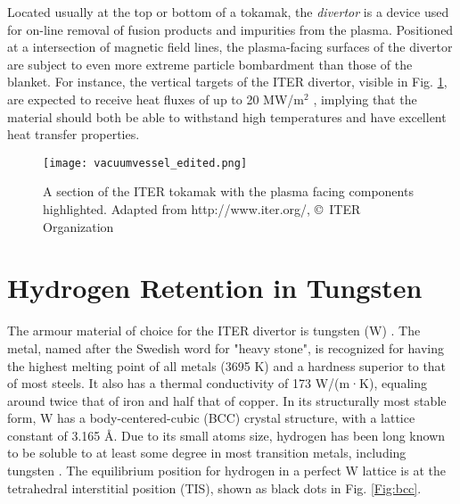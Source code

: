 Located usually at the top or bottom of a tokamak, the \textit{divertor} is a device used for on-line removal of fusion products and impurities from the plasma.
Positioned at a intersection of magnetic field lines, the plasma-facing surfaces of the divertor are subject to even more extreme particle bombardment than those of the blanket.
For instance, the vertical targets of the ITER divertor, visible in Fig. \ref{fig:ITERslice}, are expected to receive heat fluxes of up to 20 MW/m$^2$ \cite{Iter1234Divertor}, implying that the material should both be able to withstand high temperatures and have excellent heat transfer properties.

\vspace{35mm}
\begin{figure}[!ht]
\center
\texttt{[image: vacuumvessel\_edited.png]}
\caption{A section of the ITER tokamak with the plasma facing components highlighted. Adapted from http://www.iter.org/, \copyright~ITER Organization}
\label{fig:ITERslice}
\end{figure}

\section{Hydrogen Retention in Tungsten}
The armour material of choice for the ITER divertor is tungsten (W) \cite{PITTS2013S48}.
The metal, named after the Swedish word for "heavy stone", is recognized for having the highest melting point of all metals (3695 K) and a hardness superior to that of most steels. 
It also has a thermal conductivity of 173 W/(m·K), equaling around twice that of iron and half that of copper. 
In its structurally most stable form, W has a body-centered-cubic (BCC) crystal structure, with a lattice constant of 3.165 \AA.
Due to its small atoms size, hydrogen has been long known to be soluble to at least some degree in most transition metals, including tungsten \cite{smith1934occlusion, frauenfelder1969solution}.
The equilibrium position for hydrogen in a perfect W lattice is at the tetrahedral interstitial position (TIS), shown as black dots in Fig. \ref{Fig:bcc}. 

